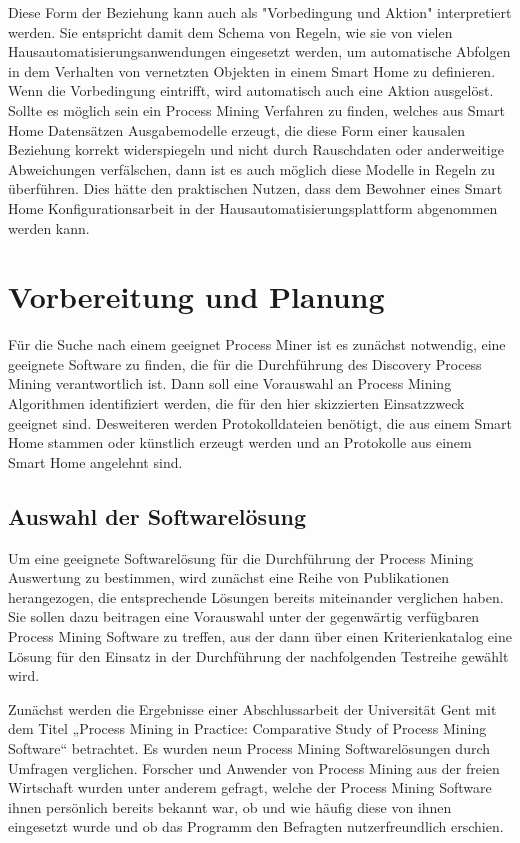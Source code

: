 Diese Form der Beziehung kann auch als "Vorbedingung und Aktion" interpretiert werden. Sie entspricht damit dem Schema von Regeln, wie sie von vielen Hausautomatisierungsanwendungen eingesetzt werden, um automatische Abfolgen in dem Verhalten von vernetzten Objekten in einem Smart Home zu definieren. Wenn die Vorbedingung eintrifft, wird automatisch auch eine Aktion ausgelöst. Sollte es möglich sein ein Process Mining Verfahren zu finden, welches aus Smart Home Datensätzen Ausgabemodelle erzeugt, die diese Form einer kausalen Beziehung korrekt widerspiegeln und nicht durch Rauschdaten oder anderweitige Abweichungen verfälschen, dann ist es auch möglich diese Modelle in Regeln zu überführen. Dies hätte den praktischen Nutzen, dass dem Bewohner eines Smart Home Konfigurationsarbeit in der Hausautomatisierungsplattform abgenommen werden kann.

\section{Vorbereitung und Planung}\label{sec:prep}
Für die Suche nach einem geeignet Process Miner ist es zunächst notwendig, eine geeignete Software zu finden, die für die Durchführung des Discovery Process Mining verantwortlich ist. 
Dann soll eine Vorauswahl an Process Mining Algorithmen identifiziert werden, die für den hier skizzierten Einsatzzweck geeignet sind. Desweiteren werden Protokolldateien benötigt, die aus einem Smart Home stammen oder künstlich erzeugt werden und an Protokolle aus einem Smart Home angelehnt sind.

\subsection{Auswahl der Softwarelösung}
Um eine geeignete Softwarelösung für die Durchführung der Process Mining Auswertung zu bestimmen, wird zunächst eine Reihe von Publikationen herangezogen, die entsprechende Lösungen bereits miteinander verglichen haben. Sie sollen dazu beitragen eine Vorauswahl unter der gegenwärtig verfügbaren Process Mining Software zu treffen, aus der dann über einen Kriterienkatalog eine Lösung für den Einsatz in der Durchführung der nachfolgenden Testreihe gewählt wird. 

Zunächst werden die Ergebnisse einer Abschlussarbeit der Universität Gent mit dem Titel „Process Mining in Practice: Comparative Study of Process Mining Software“ \cite{verstraete} betrachtet. Es wurden neun Process Mining Softwarelösungen durch Umfragen verglichen. Forscher und Anwender von Process Mining aus der freien Wirtschaft wurden unter anderem gefragt, welche der Process Mining Software ihnen persönlich bereits bekannt war, ob und wie häufig diese von ihnen eingesetzt wurde und ob das Programm den Befragten nutzerfreundlich erschien.

